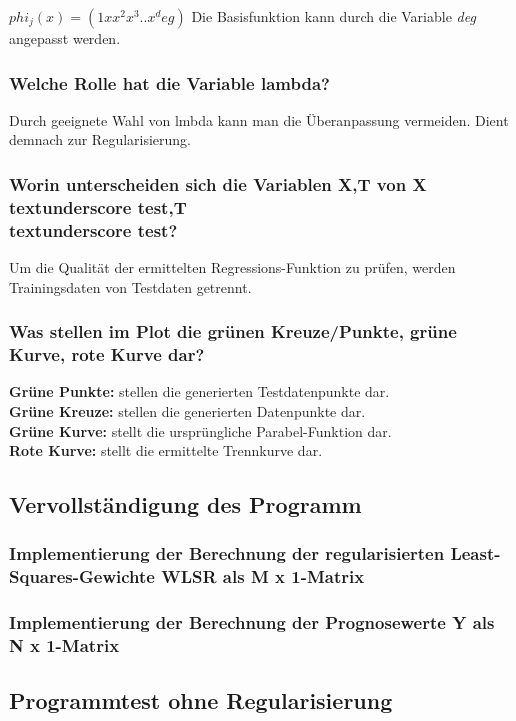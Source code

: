 $phi_j (x) = (1 x x^2 x^3 .. x^deg)$
Die Basisfunktion kann durch die Variable \textit{deg} angepasst werden.

\subsubsection{Welche Rolle hat die Variable lambda?}
Durch geeignete Wahl von lmbda kann man die Überanpassung vermeiden.
Dient demnach zur Regularisierung.

\subsubsection{Worin unterscheiden sich die Variablen X,T von X\\textunderscore test,T\\textunderscore test?}
Um die Qualität der ermittelten Regressions-Funktion zu prüfen, werden Trainingsdaten von Testdaten getrennt.

\subsubsection{Was stellen im Plot die grünen Kreuze/Punkte, grüne Kurve, rote Kurve dar?}
\textbf{Grüne Punkte:} stellen die generierten Testdatenpunkte dar.\\
\textbf{Grüne Kreuze:} stellen die generierten Datenpunkte dar.\\
\textbf{Grüne Kurve:} stellt die ursprüngliche Parabel-Funktion dar.\\
\textbf{Rote Kurve:} stellt die ermittelte Trennkurve dar.

\subsection{Vervollständigung des Programm}

\subsubsection{Implementierung der Berechnung der regularisierten Least-Squares-Gewichte W\textunderscore LSR als M x 1-Matrix}

\subsubsection{Implementierung der Berechnung der Prognosewerte Y als N x 1-Matrix}

\subsection{Programmtest ohne Regularisierung}


